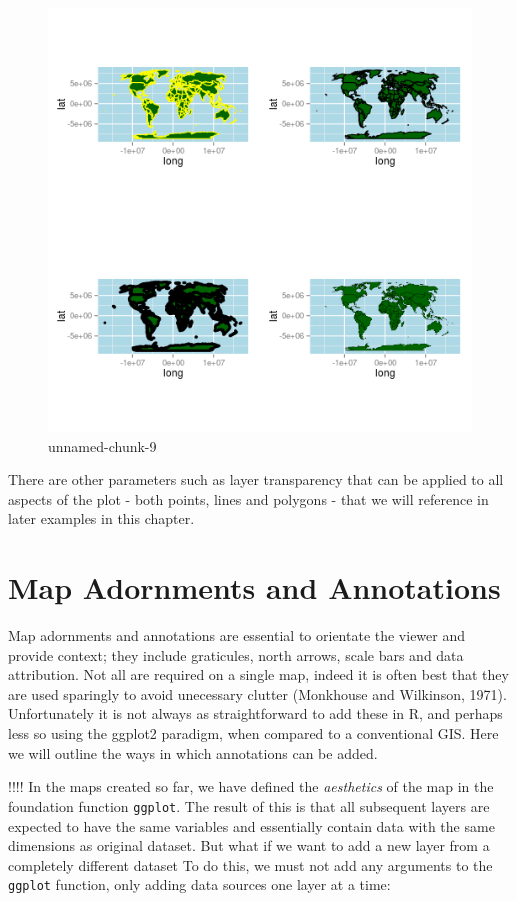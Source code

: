 \documentclass[]{article}
\makeatletter
\def\maxwidth{\ifdim\Gin@nat@width>\linewidth\linewidth
\else\Gin@nat@width\fi}
\let\Oldincludegraphics\includegraphics
\renewcommand{\includegraphics}[1]{\Oldincludegraphics[width=\maxwidth]{#1}}
\makeatother
\begin{document}
\begin{figure}[htbp]
\centering
\includegraphics{figure/unnamed-chunk-9.png}
\caption{unnamed-chunk-9}
\end{figure}

There are other parameters such as layer transparency that can be
applied to all aspects of the plot - both points, lines and polygons -
that we will reference in later examples in this chapter.

\section{Map Adornments and Annotations}

Map adornments and annotations are essential to orientate the viewer and
provide context; they include graticules, north arrows, scale bars and
data attribution. Not all are required on a single map, indeed it is
often best that they are used sparingly to avoid unecessary clutter
(Monkhouse and Wilkinson, 1971). Unfortunately it is not always as
straightforward to add these in R, and perhaps less so using the ggplot2
paradigm, when compared to a conventional GIS. Here we will outline the
ways in which annotations can be added.

!!!! In the maps created so far, we have defined the \emph{aesthetics}
of the map in the foundation function \texttt{ggplot}. The result of
this is that all subsequent layers are expected to have the same
variables and essentially contain data with the same dimensions as
original dataset. But what if we want to add a new layer from a
completely different dataset To do this, we must not add any arguments
to the \texttt{ggplot} function, only adding data sources one layer at a
time:
\end{document}

